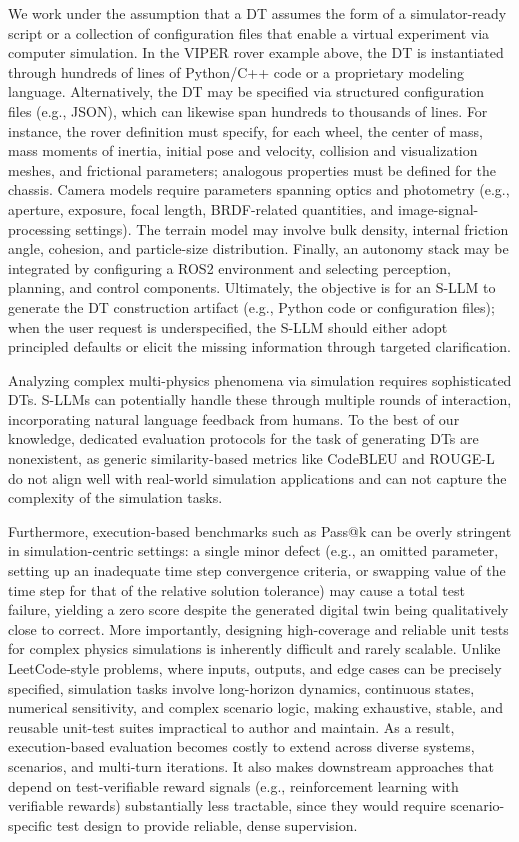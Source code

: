 \documentclass{ieeeaccess}
\begin{document}
We work under the assumption that a DT assumes the form of a simulator-ready script or a collection of configuration files that enable a virtual experiment via computer simulation. In the VIPER rover example above, the DT is instantiated through hundreds of lines of Python/C++ code or a proprietary modeling language. Alternatively, the DT may be specified via structured configuration files (e.g., JSON), which can likewise span hundreds to thousands of lines. For instance, the rover definition must specify, for each wheel, the center of mass, mass moments of inertia, initial pose and velocity, collision and visualization meshes, and frictional parameters; analogous properties must be defined for the chassis. Camera models require parameters spanning optics and photometry (e.g., aperture, exposure, focal length, BRDF-related quantities, and image-signal-processing settings). The terrain model may involve bulk density, internal friction angle, cohesion, and particle-size distribution. Finally, an autonomy stack may be integrated by configuring a ROS2 environment and selecting perception, planning, and control components. Ultimately, the objective is for an S-LLM to generate the DT construction artifact (e.g., Python code or configuration files); when the user request is underspecified, the S-LLM should either adopt principled defaults or elicit the missing information through targeted clarification.


Analyzing complex multi-physics phenomena via simulation requires sophisticated DTs. 
S-LLMs can potentially handle these through multiple rounds of interaction, 
incorporating natural language feedback from humans. 
To the best of our knowledge, dedicated evaluation protocols for the task of generating DTs are nonexistent, 
as generic similarity-based metrics like CodeBLEU \cite{ren2020codebleu} and ROUGE-L \cite{lin-2004-rouge} 
do not align well with real-world simulation applications and can not capture the complexity of the simulation tasks.

Furthermore, execution-based benchmarks such as Pass@k \cite{chen2021evaluating} can be overly stringent in simulation-centric settings: a single minor defect (e.g., an omitted parameter, setting up an inadequate time step convergence criteria, or swapping value of the time step for that of the relative solution tolerance) may cause a total test failure, yielding a zero score despite the generated digital twin being qualitatively close to correct. More importantly, designing high-coverage and reliable unit tests for complex physics simulations is inherently difficult and rarely scalable. Unlike LeetCode-style problems, where inputs, outputs, and edge cases can be precisely specified, simulation tasks involve long-horizon dynamics, continuous states, numerical sensitivity, and complex scenario logic, making exhaustive, stable, and reusable unit-test suites impractical to author and maintain. As a result, execution-based evaluation becomes costly to extend across diverse systems, scenarios, and multi-turn iterations. It also makes downstream approaches that depend on test-verifiable reward signals (e.g., reinforcement learning with verifiable rewards) substantially less tractable, since they would require scenario-specific test design to provide reliable, dense supervision.
\end{document}
